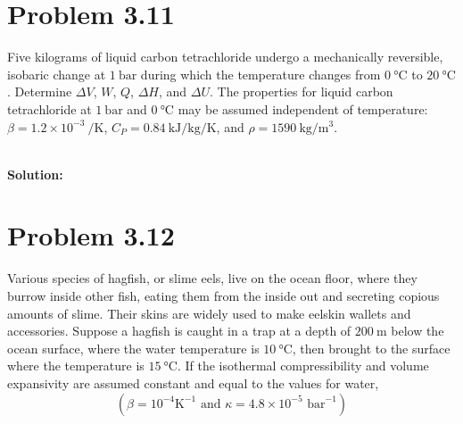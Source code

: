 \documentclass{article}
\newenvironment{solution}{\par\noindent\textbf{\\Solution:\\}}{\par\medskip}
\begin{document}
\section*{Problem 3.11}
Five kilograms of liquid carbon tetrachloride undergo a mechanically reversible, isobaric change at $1~\unit{ \bar }$ during which the temperature changes from $0~\unit{ \degreeCelsius }$ to $20~\unit{ \degreeCelsius }$. Determine $\Delta V$, $W$, $Q$, $\Delta H$, and $\Delta U$. The properties for liquid carbon tetrachloride at $1~\unit{ \bar }$ and $0~\unit{ \degreeCelsius }$ may be assumed independent of temperature: $\beta = 1.2 \times 10^{-3}~\unit{ \per\kelvin }$, $C_P = 0.84~\unit{ \kilo\joule\per\kilo\gram\per\kelvin }$, and $\rho = 1590~\unit{ \kilo\gram\per\meter\cubed }$.

\begin{solution}

\end{solution}

\section*{Problem 3.12}
Various species of hagfish, or slime eels, live on the ocean floor, where they burrow inside other fish, eating them from the inside out and secreting copious amounts of slime. Their skins are widely used to make eelskin wallets and accessories. Suppose a hagfish is caught in a trap at a depth of $200~\unit{ \meter }$ below the ocean surface, where the water temperature is $10~\unit{ \degreeCelsius }$, then brought to the surface where the temperature is $15~\unit{ \degreeCelsius }$. If the isothermal compressibility and volume expansivity are assumed constant and equal to the values for water,
$$ (\beta = 10^{-4} \text{K}^{-1} \text{ and } \kappa = 4.8 \times 10^{-5} \text{ bar}^{-1}) $$
\end{document}
